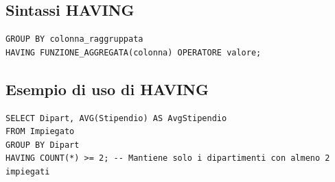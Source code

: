 \subsection{Sintassi HAVING}
\begin{lstlisting}[language=sql_generic]
GROUP BY colonna_raggruppata
HAVING FUNZIONE_AGGREGATA(colonna) OPERATORE valore;
\end{lstlisting}

\subsection{Esempio di uso di HAVING}
\begin{lstlisting}[language=sql_generic]
SELECT Dipart, AVG(Stipendio) AS AvgStipendio
FROM Impiegato
GROUP BY Dipart
HAVING COUNT(*) >= 2; -- Mantiene solo i dipartimenti con almeno 2 impiegati
\end{lstlisting}